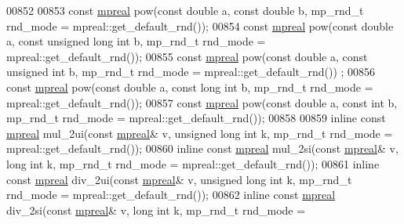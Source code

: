 \begin{DoxyCode}
00852 
00853 \textcolor{keyword}{const} \hyperlink{classmpfr_1_1mpreal}{mpreal} pow(\textcolor{keyword}{const} \textcolor{keywordtype}{double} a, \textcolor{keyword}{const} \textcolor{keywordtype}{double} b, mp\_rnd\_t rnd\_mode = mpreal::get\_default\_rnd());
00854 \textcolor{keyword}{const} \hyperlink{classmpfr_1_1mpreal}{mpreal} pow(\textcolor{keyword}{const} \textcolor{keywordtype}{double} a, \textcolor{keyword}{const} \textcolor{keywordtype}{unsigned} \textcolor{keywordtype}{long} \textcolor{keywordtype}{int} b, mp\_rnd\_t rnd\_mode = 
      mpreal::get\_default\_rnd());
00855 \textcolor{keyword}{const} \hyperlink{classmpfr_1_1mpreal}{mpreal} pow(\textcolor{keyword}{const} \textcolor{keywordtype}{double} a, \textcolor{keyword}{const} \textcolor{keywordtype}{unsigned} \textcolor{keywordtype}{int} b, mp\_rnd\_t rnd\_mode = mpreal::get\_default\_rnd())
      ;
00856 \textcolor{keyword}{const} \hyperlink{classmpfr_1_1mpreal}{mpreal} pow(\textcolor{keyword}{const} \textcolor{keywordtype}{double} a, \textcolor{keyword}{const} \textcolor{keywordtype}{long} \textcolor{keywordtype}{int} b, mp\_rnd\_t rnd\_mode = mpreal::get\_default\_rnd());
00857 \textcolor{keyword}{const} \hyperlink{classmpfr_1_1mpreal}{mpreal} pow(\textcolor{keyword}{const} \textcolor{keywordtype}{double} a, \textcolor{keyword}{const} \textcolor{keywordtype}{int} b, mp\_rnd\_t rnd\_mode = mpreal::get\_default\_rnd());
00858 
00859 \textcolor{keyword}{inline} \textcolor{keyword}{const} \hyperlink{classmpfr_1_1mpreal}{mpreal} mul\_2ui(\textcolor{keyword}{const} \hyperlink{classmpfr_1_1mpreal}{mpreal}& v, \textcolor{keywordtype}{unsigned} \textcolor{keywordtype}{long} \textcolor{keywordtype}{int} k, mp\_rnd\_t rnd\_mode = 
      mpreal::get\_default\_rnd());
00860 \textcolor{keyword}{inline} \textcolor{keyword}{const} \hyperlink{classmpfr_1_1mpreal}{mpreal} mul\_2si(\textcolor{keyword}{const} \hyperlink{classmpfr_1_1mpreal}{mpreal}& v, \textcolor{keywordtype}{long} \textcolor{keywordtype}{int} k, mp\_rnd\_t rnd\_mode = 
      mpreal::get\_default\_rnd());
00861 \textcolor{keyword}{inline} \textcolor{keyword}{const} \hyperlink{classmpfr_1_1mpreal}{mpreal} div\_2ui(\textcolor{keyword}{const} \hyperlink{classmpfr_1_1mpreal}{mpreal}& v, \textcolor{keywordtype}{unsigned} \textcolor{keywordtype}{long} \textcolor{keywordtype}{int} k, mp\_rnd\_t rnd\_mode = 
      mpreal::get\_default\_rnd());
00862 \textcolor{keyword}{inline} \textcolor{keyword}{const} \hyperlink{classmpfr_1_1mpreal}{mpreal} div\_2si(\textcolor{keyword}{const} \hyperlink{classmpfr_1_1mpreal}{mpreal}& v, \textcolor{keywordtype}{long} \textcolor{keywordtype}{int} k, mp\_rnd\_t rnd\_mode = 

\end{DoxyCode}
